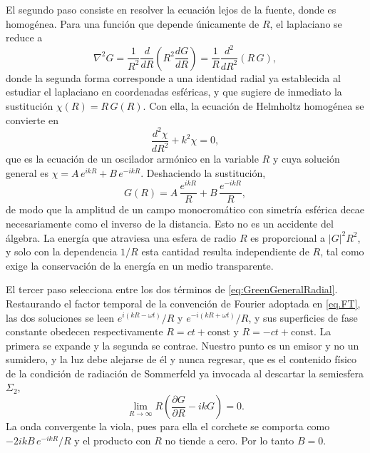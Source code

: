 		El segundo paso consiste en resolver la ecuación lejos de la fuente, donde es homogénea. Para una función que depende únicamente de $R$, el laplaciano se reduce a
		\begin{equation}\label{eq:GreenRadialLaplacian}
			\nabla^{2}G = \frac{1}{R^{2}}\frac{d}{dR}\left(R^{2}\frac{dG}{dR}\right) = \frac{1}{R}\frac{d^{2}}{dR^{2}}\left(R\,G\right),
		\end{equation}
		donde la segunda forma corresponde a una identidad radial ya establecida al estudiar el laplaciano en coordenadas esféricas, y que sugiere de inmediato la sustitución $\chi(R) = R\,G(R)$. Con ella, la ecuación de Helmholtz homogénea se convierte en
		\begin{equation}\label{eq:RadialOscillator}
			\frac{d^{2}\chi}{dR^{2}} + k^{2}\chi = 0 ,
		\end{equation}
		que es la ecuación de un oscilador armónico en la variable $R$ y cuya solución general es $\chi = A\,e^{ikR} + B\,e^{-ikR}$. Deshaciendo la sustitución,
		\begin{equation}\label{eq:GreenGeneralRadial}
			G(R) = A\,\frac{e^{ikR}}{R} + B\,\frac{e^{-ikR}}{R},
		\end{equation}
		de modo que la amplitud de un campo monocromático con simetría esférica decae necesariamente como el inverso de la distancia. Esto no es un accidente del álgebra. La energía que atraviesa una esfera de radio $R$ es proporcional a $|G|^{2}R^{2}$, y solo con la dependencia $1/R$ esta cantidad resulta independiente de $R$, tal como exige la conservación de la energía en un medio transparente.

		El tercer paso selecciona entre los dos términos de \eqref{eq:GreenGeneralRadial}. Restaurando el factor temporal de la convención de Fourier adoptada en \eqref{eq.FT}, las dos soluciones se leen $e^{i(kR-\omega t)}/R$ y $e^{-i(kR+\omega t)}/R$, y sus superficies de fase constante obedecen respectivamente $R = ct + \text{const}$ y $R = -ct + \text{const}$. La primera se expande y la segunda se contrae. Nuestro punto es un emisor y no un sumidero, y la luz debe alejarse de él y nunca regresar, que es el contenido físico de la condición de radiación de Sommerfeld ya invocada al descartar la semiesfera $\Sigma_{2}$,
		\begin{equation}\label{eq:SommerfeldRadiation}
			\lim_{R\to\infty} R\left(\frac{\partial G}{\partial R} - ikG\right) = 0 .
		\end{equation}
		La onda convergente la viola, pues para ella el corchete se comporta como $-2ikB\,e^{-ikR}/R$ y el producto con $R$ no tiende a cero. Por lo tanto $B = 0$.

